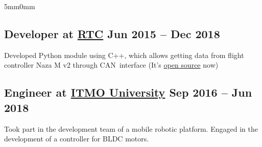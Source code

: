 \documentclass[10pt]{article}
\newcommand{\lmvalue}{5mm}
\newcommand{\rmvalue}{0mm}
\begin{document}
\begin{changemargin}{\lmvalue}{\rmvalue}
		\subsection*{Developer at \href{https://er.rtc.ru/en/}{RTC}
		\hfill {\color{gray}Jun 2015 – Dec 2018}}

		Developed Python module using C++, which allows getting data from flight controller Naza M v2 through
		CAN~interface (It's \href{https://github.com/viktorvorobev/NazaCanDecoder}{open source} now)

		\subsection*{Engineer at \href{https://en.itmo.ru/}{ITMO University}
		\hfill {\color{gray}Sep 2016 – Jun 2018}}

		Took part in the development team of a mobile robotic platform.
        Engaged in the development of a controller for BLDC motors.

    \end{changemargin}
\end{document}
